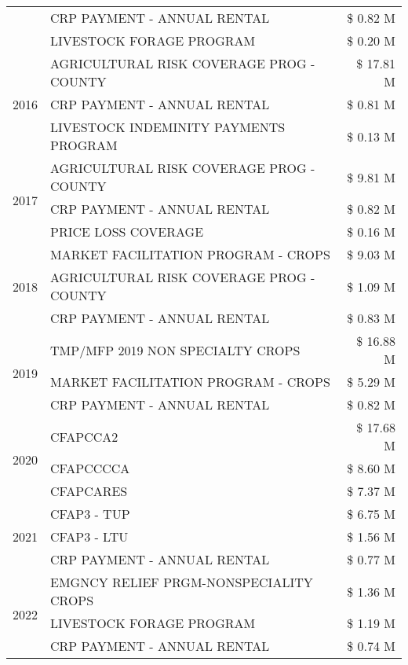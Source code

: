 \begin{tabular}{llr}
 & CRP PAYMENT - ANNUAL RENTAL & \$ 0.82 M \\
 & LIVESTOCK FORAGE PROGRAM & \$ 0.20 M \\
\cline{1-3}
\multirow[t]{3}{*}{2016} & AGRICULTURAL RISK COVERAGE PROG - COUNTY & \$ 17.81 M \\
 & CRP PAYMENT - ANNUAL RENTAL & \$ 0.81 M \\
 & LIVESTOCK INDEMINITY PAYMENTS PROGRAM & \$ 0.13 M \\
\cline{1-3}
\multirow[t]{3}{*}{2017} & AGRICULTURAL RISK COVERAGE PROG - COUNTY & \$ 9.81 M \\
 & CRP PAYMENT - ANNUAL RENTAL & \$ 0.82 M \\
 & PRICE LOSS COVERAGE & \$ 0.16 M \\
\cline{1-3}
\multirow[t]{3}{*}{2018} & MARKET FACILITATION PROGRAM - CROPS & \$ 9.03 M \\
 & AGRICULTURAL RISK COVERAGE PROG - COUNTY & \$ 1.09 M \\
 & CRP PAYMENT - ANNUAL RENTAL & \$ 0.83 M \\
\cline{1-3}
\multirow[t]{3}{*}{2019} & TMP/MFP 2019 NON SPECIALTY CROPS & \$ 16.88 M \\
 & MARKET FACILITATION PROGRAM - CROPS & \$ 5.29 M \\
 & CRP PAYMENT - ANNUAL RENTAL & \$ 0.82 M \\
\cline{1-3}
\multirow[t]{3}{*}{2020} & CFAPCCA2 & \$ 17.68 M \\
 & CFAPCCCCA & \$ 8.60 M \\
 & CFAPCARES & \$ 7.37 M \\
\cline{1-3}
\multirow[t]{3}{*}{2021} & CFAP3 - TUP & \$ 6.75 M \\
 & CFAP3 - LTU & \$ 1.56 M \\
 & CRP PAYMENT - ANNUAL RENTAL & \$ 0.77 M \\
\cline{1-3}
\multirow[t]{3}{*}{2022} & EMGNCY RELIEF PRGM-NONSPECIALITY CROPS & \$ 1.36 M \\
 & LIVESTOCK FORAGE PROGRAM & \$ 1.19 M \\
 & CRP PAYMENT - ANNUAL RENTAL & \$ 0.74 M \\
\cline{1-3}
\bottomrule
\end{tabular}
